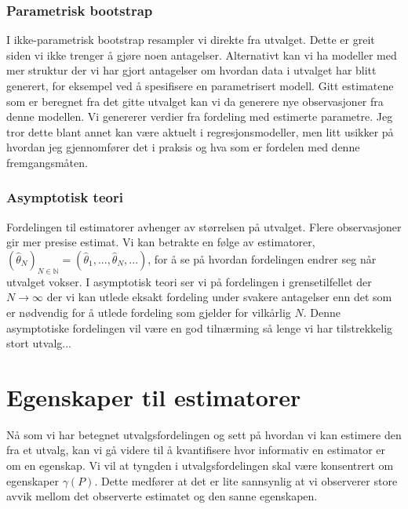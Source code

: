 \subsubsection{Parametrisk bootstrap}
I ikke-parametrisk bootstrap resampler vi direkte fra utvalget. Dette er greit siden vi ikke trenger å gjøre noen antagelser. Alternativt kan vi ha modeller med mer struktur der vi har gjort antagelser om hvordan data i utvalget har blitt generert, for eksempel ved å spesifisere en parametrisert modell. Gitt estimatene som er beregnet fra det gitte utvalget kan vi da generere nye observasjoner fra denne modellen. Vi genererer verdier fra fordeling med estimerte parametre. Jeg tror dette blant annet kan være aktuelt i regresjonsmodeller, men litt usikker på hvordan jeg gjennomfører det i praksis og hva som er fordelen med denne fremgangsmåten. 
\subsubsection{Asymptotisk teori}
Fordelingen til estimatorer avhenger av størrelsen på utvalget. Flere observasjoner gir mer presise estimat. Vi kan betrakte en følge av estimatorer, $(\hat{\theta}_N)_{N \in \mathbb{N}} = (\hat{\theta}_1, ..., \hat{\theta}_N,...)$, for å se på hvordan fordelingen endrer seg når utvalget vokser. I asymptotisk teori ser vi på fordelingen i grensetilfellet der $N \rightarrow \infty$ der vi kan utlede eksakt fordeling under svakere antagelser enn det som er nødvendig for å utlede fordeling som gjelder for vilkårlig $N$. Denne asymptotiske fordelingen vil være en god tilnærming så lenge vi har tilstrekkelig stort utvalg...
\section{Egenskaper til estimatorer}
Nå som vi har betegnet utvalgsfordelingen og sett på hvordan vi kan estimere den fra et utvalg, kan vi gå videre til å kvantifisere hvor informativ en estimator er om en egenskap. Vi vil at tyngden i utvalgsfordelingen skal være konsentrert om egenskaper $\gamma(P)$. Dette medfører at det er lite sannsynlig at vi observerer store avvik mellom det observerte estimatet og den sanne egenskapen. 

